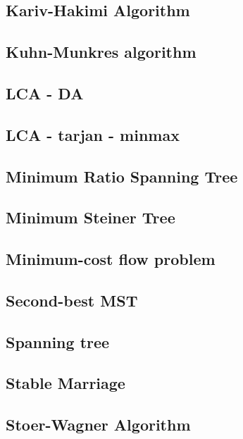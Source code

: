 \documentclass[a4paper,5pt,twocolumn,titlepage]{article}
\begin{document}
\subsection{Kariv-Hakimi Algorithm}

\subsection{Kuhn-Munkres algorithm}

\subsection{LCA - DA}

\subsection{LCA - tarjan - minmax}

\subsection{Minimum Ratio Spanning Tree}

\subsection{Minimum Steiner Tree}

\subsection{Minimum-cost flow problem}

\subsection{Second-best MST}

\subsection{Spanning tree}

\subsection{Stable Marriage}

\subsection{Stoer-Wagner Algorithm}

\end{document}
